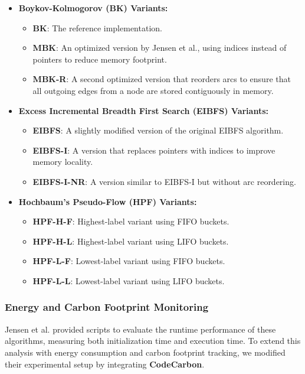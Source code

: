 \documentclass[a4paper,singleside,12pt]{report} %
\begin{document}
\begin{itemize}
    \item \textbf{Boykov-Kolmogorov (BK) Variants:}
    \begin{itemize}
        \item \textbf{BK}: The reference implementation.
        \item \textbf{MBK}: An optimized version by Jensen et al., using indices instead of pointers to reduce memory footprint.
        \item \textbf{MBK-R}: A second optimized version that reorders arcs to ensure that all outgoing edges from a node are 
        stored contiguously in memory.
    \end{itemize}
    \item \textbf{Excess Incremental Breadth First Search (EIBFS) Variants:}
    \begin{itemize}
        \item \textbf{EIBFS}: A slightly modified version of the original EIBFS algorithm.
        \item \textbf{EIBFS-I}: A version that replaces pointers with indices to improve memory locality.
        \item \textbf{EIBFS-I-NR}: A version similar to EIBFS-I but without arc reordering.
    \end{itemize}
    \item \textbf{Hochbaum’s Pseudo-Flow (HPF) Variants:}
    \begin{itemize}
        \item \textbf{HPF-H-F}: Highest-label variant using FIFO buckets.
        \item \textbf{HPF-H-L}: Highest-label variant using LIFO buckets.
        \item \textbf{HPF-L-F}: Lowest-label variant using FIFO buckets.
        \item \textbf{HPF-L-L}: Lowest-label variant using LIFO buckets.
    \end{itemize}
\end{itemize}

\subsubsection{Energy and Carbon Footprint Monitoring}

Jensen et al. provided scripts to evaluate the runtime performance of these algorithms, measuring both initialization time and 
execution time. To extend this analysis with energy consumption and carbon footprint tracking, we modified their experimental 
setup by integrating \textbf{CodeCarbon}. 
\end{document}
